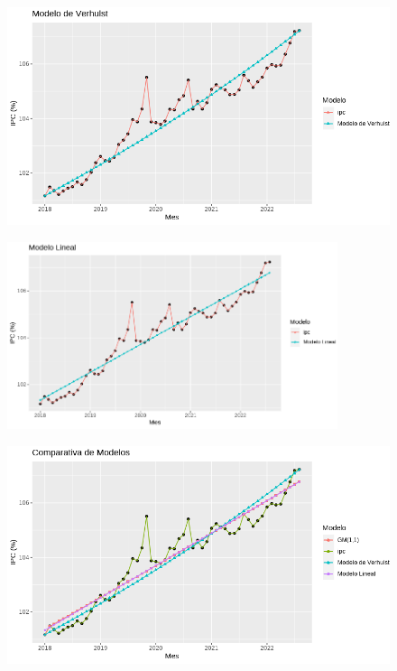 \documentclass[a4paper,10pt]{article}
\begin{document}
\begin{figure}[htb!]
 \centering
 \includegraphics[width=\textwidth]{../images/ver.png}
\end{figure}

\begin{figure}[htb!]
 \centering
 \includegraphics[height=5.5cm]{../images/lineal.png}
\end{figure}

\begin{figure}[htb!]
 \centering
 \includegraphics[width=\textwidth]{../images/comparativa.png}
\end{figure}
\end{document}
